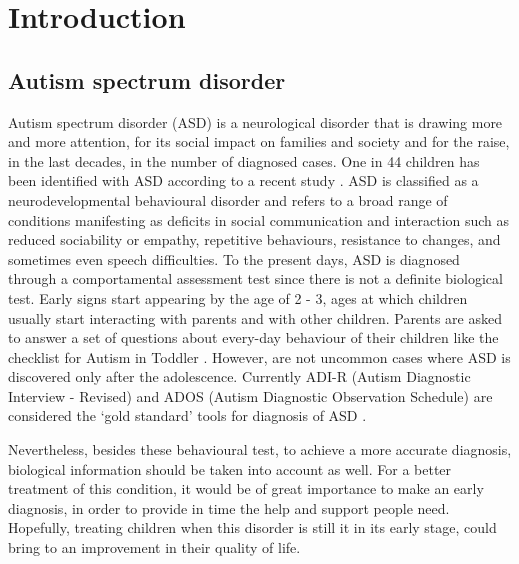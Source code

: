 \documentclass[11pt]{report}
\begin{document}


\chapter{Introduction}\label{chap:introduction}
\section{Autism spectrum disorder} \label{chap:autism}
Autism spectrum disorder (ASD) is a neurological disorder that is drawing more and more attention, for its social impact on families and society and for the raise, in the last decades, in the number of diagnosed cases.
One in 44 children has been identified with ASD according to a recent study \cite{maenner2021}.
ASD is classified as a neurodevelopmental behavioural disorder \cite{guze-1995} \cite{who-1993} and refers to a broad range of conditions manifesting as deficits in social communication and interaction such as reduced sociability or empathy, repetitive behaviours, resistance to changes, and sometimes even speech difficulties.\cite{rapin-2008}
To the present days, ASD is diagnosed through a comportamental assessment test since there is not a definite biological test.
Early signs start appearing by the age of 2 - 3, ages at which children usually start interacting with parents and with other children.
Parents are asked to answer a set of questions about every-day behaviour of their children like the checklist for Autism in Toddler \cite{robins-2009}.
However, are not uncommon cases where ASD is discovered only after the adolescence.
Currently ADI-R (Autism Diagnostic Interview - Revised) and ADOS (Autism Diagnostic Observation Schedule) are considered the ‘gold standard’ tools for diagnosis of ASD \cite{ozonoff-2015} \cite{lecouteur-2008}.

Nevertheless, besides these behavioural test, to achieve a more accurate diagnosis, biological information should be taken into account as well.
For a better treatment of this condition, it would be of great importance to make an early diagnosis, in order to provide in time the help and support people need.
Hopefully, treating children when this disorder is still it in its early stage, could bring to an improvement in their quality of life.
\end{document}
